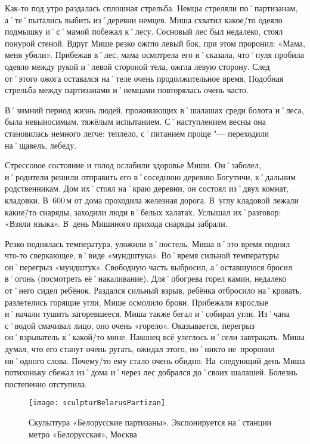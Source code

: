 Как-то под утро раздалась сплошная стрельба. Немцы стреляли по˚партизанам, а˚те˚пытались выбить из˚деревни немцев. Миша схватил какое\=/то одеяло подмышку и˚с˚мамой побежал к˚лесу. Сосновый лес был недалеко, стоял понурой стеной. Вдруг Мише резко ожгло левый бок, при этом проронил: «Мама, меня убили». Прибежав в˚лес, мама осмотрела его и˚сказала, что˚пуля пробила одеяло между рукой и˚левой стороной тела, ожгла левую сторону. След от˚этого ожога оставался на˚теле очень продолжительное время. Подобная стрельба между партизанами и˚немцами повторялась очень часто.

В˚зимний период жизнь людей, проживающих в˚шалашах среди болота и˚леса, была невыносимым, тяжёлым испытанием. С˚наступлением весны она становилась немного легче: теплело, с˚питанием проще "--- переходили на˚щавель, лебеду. 

Стрессовое состояние и голод ослабили здоровье Миши. Он˚заболел, и˚родители решили отправить его в˚соседнюю деревню Богутичи, к˚дальним родственникам. Дом их˚стоял на˚краю деревни, он состоял из˚двух комнат, кладовки. В~600\,м от дома проходила железная дорога. В~углу кладовой лежали какие\=/то снаряды, заходили люди в˚белых халатах. Услышал их˚разговор: «Взяли языка». В~день Мишиного прихода снаряды забрали. 

Резко поднялась температура, уложили в˚постель. Миша в˚это время поднял что-то сверкающее, в˚виде «мундштука». Во˚время сильной температуры он˚перегрыз «мундштук». Свободную часть выбросил, а˚оставшуюся бросил в˚огонь (посмотреть её˚накаливание). Для˚обогрева горел камин, недалеко от˚него сидел ребёнок. Раздался сильный взрыв, ребёнка отбросило на˚кровать, разлетелись горящие угли, Мише осмолило брови. Прибежали взрослые и˚начали тушить загоревшееся. Миша также бегал и˚собирал угли. Из˚чана с˚водой смачивал лицо, оно очень «горело». Оказывается, перегрыз он˚взрыватель к˚какой\=/то мине. Наконец всё улеглось и˚сели завтракать. Миша думал, что его станут очень ругать, ожидал этого, но˚никто не~проронил ни˚одного слова. Почему\=/то ему стало очень обидно. На~следующий день Миша потихоньку сбежал из˚дома и˚через лес добрался до˚своих шалашей. Болезнь постепенно отступила. 

\begin{wrapfigure}{O}{.4\textwidth}
\centering
\texttt{[image: sculpturBelarusPartizan]}
\caption{Скульптура «Белорусские партизаны». Экспонируется на˚станции метро «Белорусская», Москва}
\label{fig:sculpturBelarusPartizan}
\end{wrapfigure}

